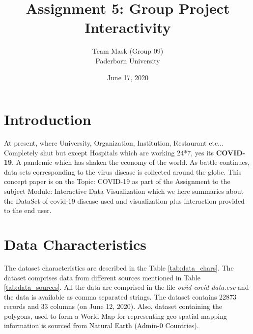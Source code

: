\documentclass[10pt]{article}
\newcommand{\participant}{Team Mask (Group 09)}
\newcommand{\affiliation}{Paderborn University}
\newcommand{\topic}{Assignment 5: Group Project Interactivity}
\newcommand{\submissiondate}{June 17, 2020}
\begin{document}
\title{\topic}
\author{\Large{\participant}\\ \affiliation \\}
\date{\submissiondate}
\maketitle
\thispagestyle{empty}




\section{Introduction}

\color{black}
At present, where University, Organization, Institution, Restaurant etc... Completely shut but except Hospitals which are working 24*7, yes its {\bf COVID-19}. A pandemic which has shaken the economy of the world. As battle continues, data sets corresponding to the virus disease is collected around the globe. This concept  paper is on the Topic: COVID-19 as part of the Assignment  to the subject Module: Interactive Data Visualization which we here summaries about the DataSet of covid-19 disease used and visualization plus interaction provided to the end user.	
\color{black}

\section{Data Characteristics}

The dataset characteristics are described in the Table \ref{tab:data_chars}. The dataset comprises data from different sources mentioned in Table \ref{tab:data_sources}. All the data are comprised in the file \textit{owid-covid-data.csv} and the data is available as comma separated strings. The dataset contains 22873 records and 33 columns (on June 12, 2020). Also, dataset containing the polygons, used to form a World Map for representing geo spatial mapping information is sourced from Natural Earth (Admin-0 Countries). 

\end{document}
